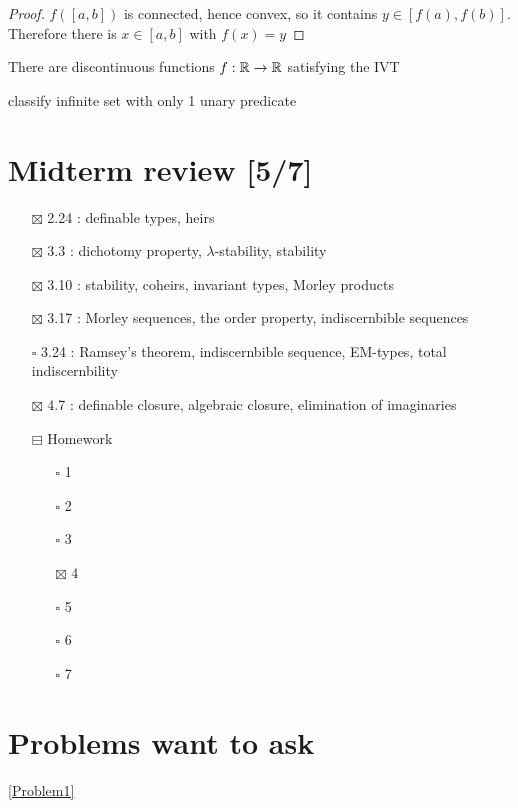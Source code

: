\documentclass[11pt]{article}
\begin{document}
\begin{proof}
\(f([a,b])\) is connected, hence convex, so it contains \(y\in[f(a),f(b)]\). Therefore there
is \(x\in[a,b]\) with \(f(x)=y\)
\end{proof}

There are discontinuous functions \(f:\mathbb{R}\to\mathbb{R}\) satisfying the IVT

classify infinite set with only 1 unary predicate

\section{Midterm review [5/7]}
\label{sec:orgd340ec3}
\begin{itemize}
\item[{$\boxtimes$}] 2.24 : definable types, heirs
\item[{$\boxtimes$}] 3.3 : dichotomy property, \(\lambda\)-stability, stability
\item[{$\boxtimes$}] 3.10 : stability, coheirs, invariant types, Morley products
\item[{$\boxtimes$}] 3.17 : Morley sequences, the order property, indiscernbible sequences
\item[{$\square$}] 3.24 : Ramsey's theorem, indiscernbible sequence, EM-types, total indiscernbility
\item[{$\boxtimes$}] 4.7 : definable closure, algebraic closure, elimination of imaginaries
\item[{$\boxminus$}] Homework
\begin{itemize}
\item[{$\square$}] 1
\item[{$\square$}] 2
\item[{$\square$}] 3
\item[{$\boxtimes$}] 4
\item[{$\square$}] 5
\item[{$\square$}] 6
\item[{$\square$}] 7
\end{itemize}
\end{itemize}

\section{Problems want to ask}
\label{sec:org27bfd9a}
\ref{Problem1}
\end{document}
